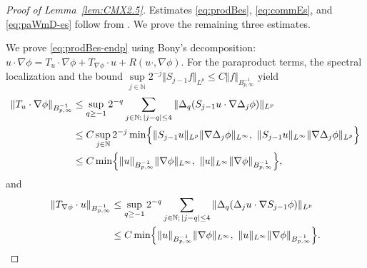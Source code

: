 \documentclass[reqno,11pt,a4paper]{amsart}
\begin{document}
\begin{proof}[Proof of Lemma~\ref{lem:CMX2.5}]
Estimates \eqref{eq:prodBes}, \eqref{eq:commEs},
and \eqref{eq:paWmD-es} follow from
\cite[Lemma~2.3]{LXY25}.
We prove the remaining three estimates.

We prove \eqref{eq:prodBes-endp} using Bony's decomposition: $u\cdot\nabla\phi
  =
  T_u\cdot\nabla\phi
  +T_{\nabla\phi}\cdot u
  +R(u\cdot,\nabla\phi)$. 
For the paraproduct terms, the spectral localization
and the bound
$\sup\limits_{j\in\mathbb{N}} 2^{-j}\Vert S_{j-1}f\Vert _{L^p} \leq C\Vert f\Vert _{B^{-1}_{p,\infty}}$
yield
\begin{align*}
  \Vert T_u\cdot\nabla\phi\Vert _{B^{-1}_{p,\infty}}
  &\leq \sup_{q\geq -1}2^{-q}\sum_{\substack{j\in\mathbb N; \,|j-q|\leq 4}}
  \Vert \Delta_q(S_{j-1}u\cdot \nabla \Delta_j\phi)\Vert _{L^p} \\
  &\leq C \sup_{j\in\mathbb{N}} 2^{-j}
  \min\Bigl\{ \Vert S_{j-1}u\Vert _{L^p}\Vert \nabla \Delta_j\phi\Vert _{L^\infty},
  \ \Vert S_{j-1}u\Vert _{L^\infty}\Vert \nabla \Delta_j\phi\Vert _{L^p} \Bigr\}\\
  &\leq C \min\Bigl\{\Vert u\Vert _{B^{-1}_{p,\infty}}\Vert \nabla \phi\Vert _{L^\infty},
  \ \Vert u\Vert _{L^\infty}\Vert \nabla\phi\Vert _{B^{-1}_{p,\infty}}\Bigr\},
\end{align*}
and
\begin{align*}
  \Vert T_{\nabla\phi}\cdot u\Vert _{B^{-1}_{p,\infty}}
  & \leq \sup_{q\geq -1} 2^{-q}\sum_{\substack{j\in\mathbb N;\, |j-q|\leq 4}}
  \Vert \Delta_q(\Delta_j u\cdot \nabla S_{j-1}\phi)\Vert _{L^p} \\
  &\leq C \min\Bigl\{\Vert u\Vert _{B^{-1}_{p,\infty}} \Vert \nabla \phi\Vert _{L^\infty},
  \ \Vert u\Vert _{L^\infty}\Vert \nabla\phi\Vert _{B^{-1}_{p,\infty}}\Bigr\}.
\end{align*}


\end{proof}
\end{document}
